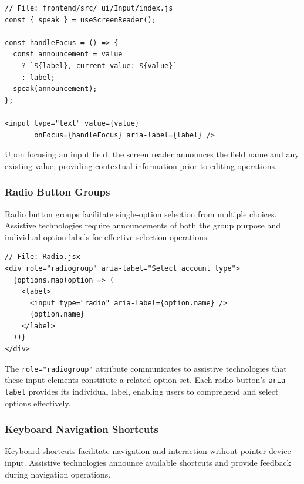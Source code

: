 \begin{lstlisting}[caption={Text input field with value announcement}, label={lst:input-sr}]
// File: frontend/src/_ui/Input/index.js
const { speak } = useScreenReader();

const handleFocus = () => {
  const announcement = value 
    ? `${label}, current value: ${value}` 
    : label;
  speak(announcement);
};

<input type="text" value={value} 
       onFocus={handleFocus} aria-label={label} />
\end{lstlisting}

Upon focusing an input field, the screen reader announces the field name and any existing value, providing contextual information prior to editing operations.

\subsubsection{Radio Button Groups}

Radio button groups facilitate single-option selection from multiple choices. Assistive technologies require announcements of both the group purpose and individual option labels for effective selection operations.

\begin{lstlisting}[caption={Radio button group with ARIA roles}, label={lst:radio-sr}]
// File: Radio.jsx
<div role="radiogroup" aria-label="Select account type">
  {options.map(option => (
    <label>
      <input type="radio" aria-label={option.name} />
      {option.name}
    </label>
  ))}
</div>
\end{lstlisting}

The \texttt{role="radiogroup"} attribute communicates to assistive technologies that these input elements constitute a related option set. Each radio button's \texttt{aria-label} provides its individual label, enabling users to comprehend and select options effectively.

\subsubsection{Keyboard Navigation Shortcuts}

Keyboard shortcuts facilitate navigation and interaction without pointer device input. Assistive technologies announce available shortcuts and provide feedback during navigation operations.

